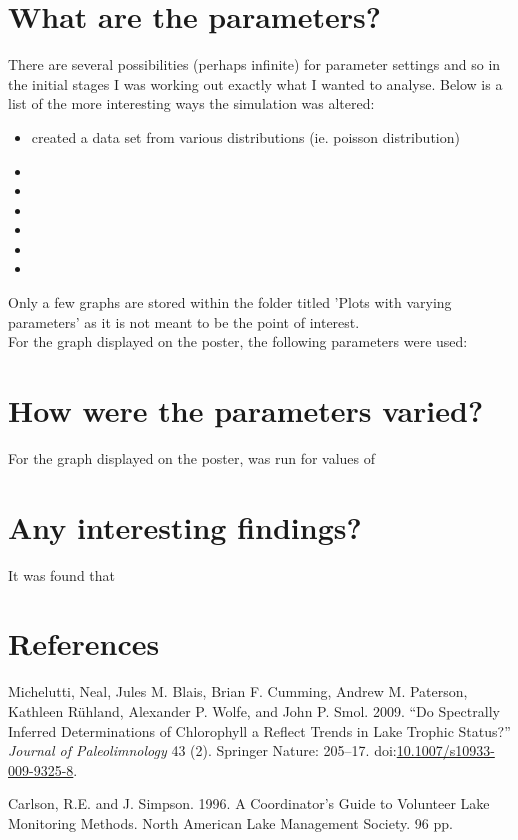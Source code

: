 \documentclass[]{article}
\begin{document}
\section{What are the parameters?}\label{what-are-the-parameters}
There are several possibilities (perhaps infinite) for parameter settings and so in the initial stages I was working out exactly what I wanted to analyse. Below is a list of the more interesting ways the simulation was altered:
\begin{itemize}
	\item created a data set from various distributions (ie. poisson distribution)
	\item
	\item
	\item
	\item
	\item
	\item 
\end{itemize}
Only a few graphs are stored within the folder titled 'Plots with varying parameters' as it is not meant to be the point of interest.\\
For the graph displayed on the poster, the following parameters were used:

\section{How were the parameters
varied?}\label{how-were-the-parameters-varied}
For the graph displayed on the poster,  was run for values of 

\section{Any interesting findings?}\label{any-interesting-findings}
It was found that 

\section*{References}\label{references}

\hypertarget{refs}{}
\hypertarget{ref-Michelutti_2009}{}
Michelutti, Neal, Jules M. Blais, Brian F. Cumming, Andrew M. Paterson,
Kathleen Rühland, Alexander P. Wolfe, and John P. Smol. 2009. ``Do
Spectrally Inferred Determinations of Chlorophyll a Reflect Trends in
Lake Trophic Status?'' \emph{Journal of Paleolimnology} 43 (2). Springer
Nature: 205--17.
doi:\href{https://doi.org/10.1007/s10933-009-9325-8}{10.1007/s10933-009-9325-8}.

Carlson, R.E. and J. Simpson. 1996. A Coordinator’s Guide to Volunteer Lake Monitoring Methods. North American Lake Management Society. 96 pp.
\end{document}
